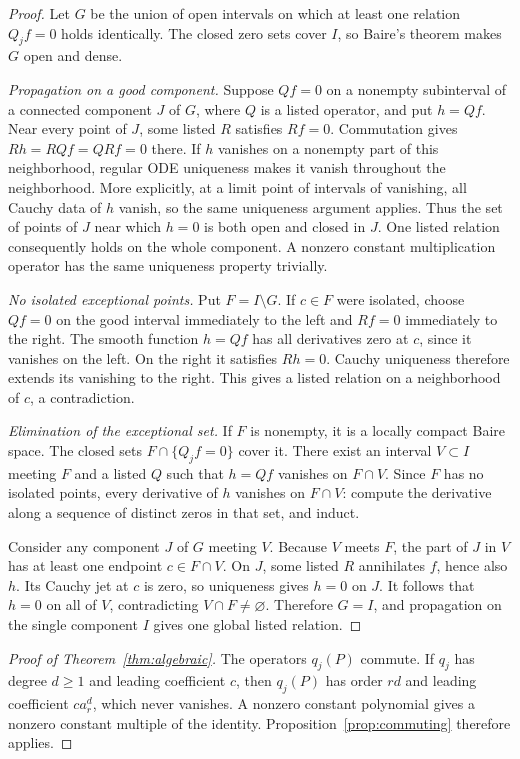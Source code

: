 \documentclass[11pt,reqno]{amsart}
\numberwithin{equation}{section}
\theoremstyle{definition}
\theoremstyle{remark}
\begin{document}
\begin{proof}
Let $G$ be the union of open intervals on which at least one relation $Q_jf=0$ holds identically. The closed zero sets cover $I$, so Baire's theorem makes $G$ open and dense.

\emph{Propagation on a good component.} Suppose $Qf=0$ on a nonempty subinterval of a connected component $J$ of $G$, where $Q$ is a listed operator, and put $h=Qf$. Near every point of $J$, some listed $R$ satisfies $Rf=0$. Commutation gives $Rh=RQf=QRf=0$ there. If $h$ vanishes on a nonempty part of this neighborhood, regular ODE uniqueness makes it vanish throughout the neighborhood. More explicitly, at a limit point of intervals of vanishing, all Cauchy data of $h$ vanish, so the same uniqueness argument applies. Thus the set of points of $J$ near which $h=0$ is both open and closed in $J$. One listed relation consequently holds on the whole component. A nonzero constant multiplication operator has the same uniqueness property trivially.

\emph{No isolated exceptional points.} Put $F=I\setminus G$. If $c\in F$ were isolated, choose $Qf=0$ on the good interval immediately to the left and $Rf=0$ immediately to the right. The smooth function $h=Qf$ has all derivatives zero at $c$, since it vanishes on the left. On the right it satisfies $Rh=0$. Cauchy uniqueness therefore extends its vanishing to the right. This gives a listed relation on a neighborhood of $c$, a contradiction.

\emph{Elimination of the exceptional set.} If $F$ is nonempty, it is a locally compact Baire space. The closed sets $F\cap\{Q_jf=0\}$ cover it. There exist an interval $V\subset I$ meeting $F$ and a listed $Q$ such that $h=Qf$ vanishes on $F\cap V$. Since $F$ has no isolated points, every derivative of $h$ vanishes on $F\cap V$: compute the derivative along a sequence of distinct zeros in that set, and induct.

Consider any component $J$ of $G$ meeting $V$. Because $V$ meets $F$, the part of $J$ in $V$ has at least one endpoint $c\in F\cap V$. On $J$, some listed $R$ annihilates $f$, hence also $h$. Its Cauchy jet at $c$ is zero, so uniqueness gives $h=0$ on $J$. It follows that $h=0$ on all of $V$, contradicting $V\cap F\ne\varnothing$. Therefore $G=I$, and propagation on the single component $I$ gives one global listed relation.
\end{proof}

\begin{proof}[Proof of Theorem~\ref{thm:algebraic}]
The operators $q_j(P)$ commute. If $q_j$ has degree $d\ge1$ and leading coefficient $c$, then $q_j(P)$ has order $rd$ and leading coefficient $c a_r^d$, which never vanishes. A nonzero constant polynomial gives a nonzero constant multiple of the identity. Proposition~\ref{prop:commuting} therefore applies.
\end{proof}
\end{document}
